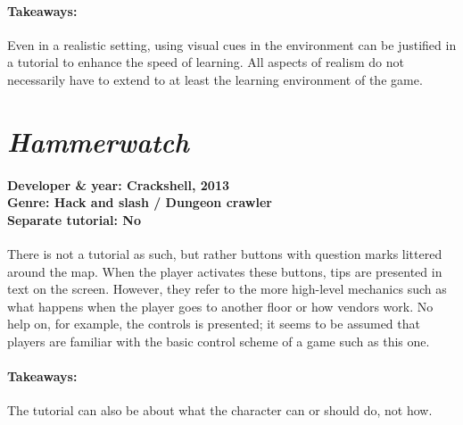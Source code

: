 \paragraph{Takeaways:}
Even in a realistic setting, using visual cues in the environment can be justified in a tutorial to enhance the speed of learning. All aspects of realism do not necessarily have to extend to at least the learning environment of the game.

\section{\textit{Hammerwatch}}
\paragraph{Developer \& year: Crackshell, 2013 \\ Genre: Hack and slash / Dungeon crawler \\ Separate tutorial: No \\}
There is not a tutorial as such, but rather buttons with question marks littered around the map. When the player activates these buttons, tips are presented in text on the screen. However, they refer to the more high-level mechanics such as what happens when the player goes to another floor or how vendors work. No help on, for example, the controls is presented; it seems to be assumed that players are familiar with the basic control scheme of a game such as this one.
\paragraph{Takeaways:}
The tutorial can also be about what the character can or should do, not how.




